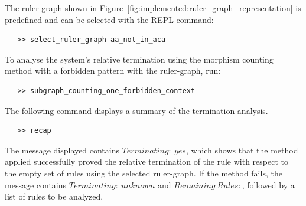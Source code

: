 The ruler-graph shown in Figure~\ref{fig:implemented:ruler_graph_representation} is predefined and can be selected with the REPL command:
 \begin{lstlisting}
   >> select_ruler_graph aa_not_in_aca
 \end{lstlisting}
To analyse the system's relative termination using the morphism counting method with a forbidden pattern with the ruler-graph, run:
 \begin{lstlisting}
   >> subgraph_counting_one_forbidden_context
\end{lstlisting}
The following command displays a summary of the termination analysis.
 \begin{lstlisting}
   >> recap
\end{lstlisting} 
The message displayed contains \colorbox{Ivory2}{$Terminating:\ yes$}, which shows that the method applied successfully proved the relative termination of the rule with respect to the empty set of rules using the selected ruler-graph. If the method fails, the message contains \colorbox{Ivory2}{$Terminating:\ unknown$} and \colorbox{Ivory2}{$Remaining\ Rules:$}, followed by a list of rules to be analyzed.

